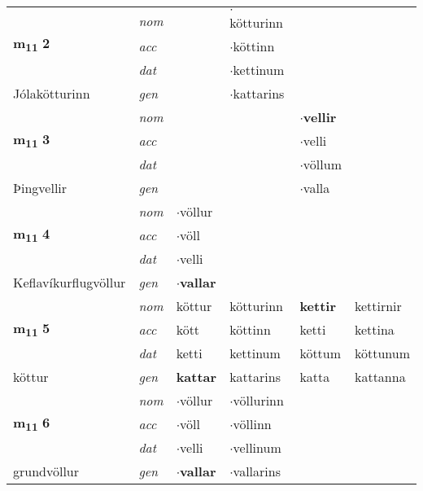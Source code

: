 \begin{longtable}[l]{llllll}
\multirow{3}{*}{{{\textbf{m{\textsubscript{11}}} \Large{\textbf{2}}}}}  & {\footnotesize{{\textit{nom}}}} &  & $\cdot$kötturinn    & \textbf{} &   \\*
 &  {\footnotesize{{\textit{acc}}}} &   & $\cdot$köttinn   &   &  \\*
 &  {\footnotesize{{\textit{dat}}}} &  & $\cdot$kettinum   &  &  \\*
 {\footnotesize{Jólakötturinn}} &   {\footnotesize{{\textit{gen}}}} & \textbf{}  & $\cdot$kattarins  &  &  \\
\cmidrule{1-6}


\multirow{3}{*}{{{\textbf{m{\textsubscript{11}}} \Large{\textbf{3}}}}}  & {\footnotesize{{\textit{nom}}}} &  &     & \textbf{$\cdot$vellir} &   \\*
 &  {\footnotesize{{\textit{acc}}}} &   &    & $\cdot$velli  &  \\*
 &  {\footnotesize{{\textit{dat}}}} &  &    & $\cdot$völlum &  \\*
 {\footnotesize{Þingvellir}} &   {\footnotesize{{\textit{gen}}}} & \textbf{}  &   & $\cdot$valla &  \\
\cmidrule{1-6}


\multirow{3}{*}{{{\textbf{m{\textsubscript{11}}} \Large{\textbf{4}}}}}  & {\footnotesize{{\textit{nom}}}} & $\cdot$völlur &     & \textbf{} &   \\*
 &  {\footnotesize{{\textit{acc}}}} & $\cdot$völl  &    &   &  \\*
 &  {\footnotesize{{\textit{dat}}}} & $\cdot$velli &    &  &  \\*
 {\footnotesize{Keflavíkurflugvöllur}} &   {\footnotesize{{\textit{gen}}}} & \textbf{$\cdot$vallar}  &   &  &  \\
\cmidrule{1-6}


\multirow{3}{*}{{{\textbf{m{\textsubscript{11}}} \Large{\textbf{5}}}}}  & {\footnotesize{{\textit{nom}}}} & köttur & kötturinn    & \textbf{kettir} & kettirnir  \\*
 &  {\footnotesize{{\textit{acc}}}} & kött  & köttinn   & ketti  & kettina \\*
 &  {\footnotesize{{\textit{dat}}}} & ketti & kettinum   & köttum & köttunum \\*
 {\footnotesize{köttur}} &   {\footnotesize{{\textit{gen}}}} & \textbf{kattar}  & kattarins  & katta & kattanna \\
\cmidrule{1-6}


\multirow{3}{*}{{{\textbf{m{\textsubscript{11}}} \Large{\textbf{6}}}}}  & {\footnotesize{{\textit{nom}}}} & $\cdot$völlur & $\cdot$völlurinn    & \textbf{} &   \\*
 &  {\footnotesize{{\textit{acc}}}} & $\cdot$völl  & $\cdot$völlinn   &   &  \\*
 &  {\footnotesize{{\textit{dat}}}} & $\cdot$velli & $\cdot$vellinum   &  &  \\*
 {\footnotesize{grundvöllur}} &   {\footnotesize{{\textit{gen}}}} & \textbf{$\cdot$vallar}  & $\cdot$vallarins  &  &  \\
\cmidrule{1-6}



\end{longtable}
